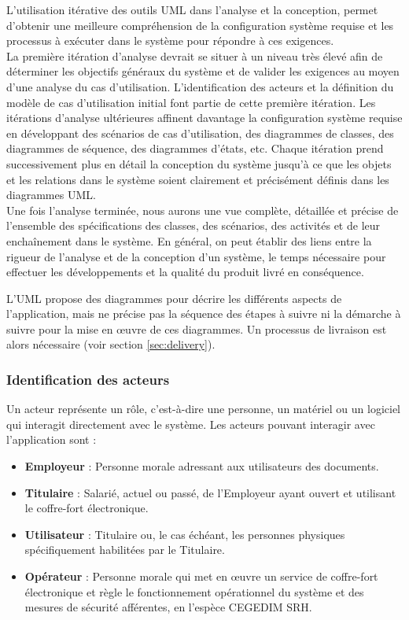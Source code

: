 L’utilisation itérative des outils UML dans l’analyse et la conception, permet d’obtenir une meilleure compréhension de la configuration système requise et les processus à exécuter dans le système pour répondre à ces exigences.\\
La première itération d’analyse devrait se situer à un niveau très élevé afin de déterminer les objectifs généraux du système et de valider les exigences au moyen d’une analyse du cas d’utilisation. L’identification des acteurs et la définition du modèle de cas d’utilisation initial font partie de cette première itération. Les itérations d’analyse ultérieures affinent davantage la configuration système requise en développant des scénarios de cas d’utilisation, des diagrammes de classes, des diagrammes de séquence, des diagrammes d’états, etc. Chaque itération prend successivement plus en détail la conception du système jusqu’à ce que les objets et les relations dans le système soient clairement et précisément définis dans les diagrammes UML.\\

Une fois l'analyse terminée, nous aurons une vue complète, détaillée et précise de l'ensemble des spécifications des classes, des scénarios, des activités et de leur enchaînement dans le système. En général, on peut établir des liens entre la rigueur de l'analyse et de la conception d'un système, le temps nécessaire pour effectuer les développements et la qualité du produit livré en conséquence.
\\
\begin{beware}[title=Conclusion : ]
    L'UML propose des diagrammes pour décrire les différents aspects de l'application, mais ne précise pas la séquence des étapes à suivre ni la démarche à suivre pour la mise en œuvre de ces diagrammes. Un processus de livraison est alors nécessaire (voir section \ref{sec:delivery}).
\end{beware}

\subsubsection{Identification des acteurs}
Un acteur représente un rôle, c'est-à-dire une personne, un matériel ou un logiciel qui interagit directement avec le système. Les acteurs pouvant interagir avec l’application sont :
\begin{itemize}
    \item \textbf{Employeur} : Personne morale adressant aux utilisateurs des documents.
    \item \textbf{Titulaire} : Salarié, actuel ou passé, de l’Employeur ayant ouvert et utilisant le coffre-fort électronique.
    \item \textbf{Utilisateur} : Titulaire ou, le cas échéant, les personnes physiques spécifiquement habilitées par le Titulaire.
    \item \textbf{Opérateur} : Personne morale qui met en œuvre un service de coffre-fort électronique et règle le fonctionnement opérationnel du système et des mesures de sécurité afférentes, en l’espèce CEGEDIM SRH. 
\end{itemize}

